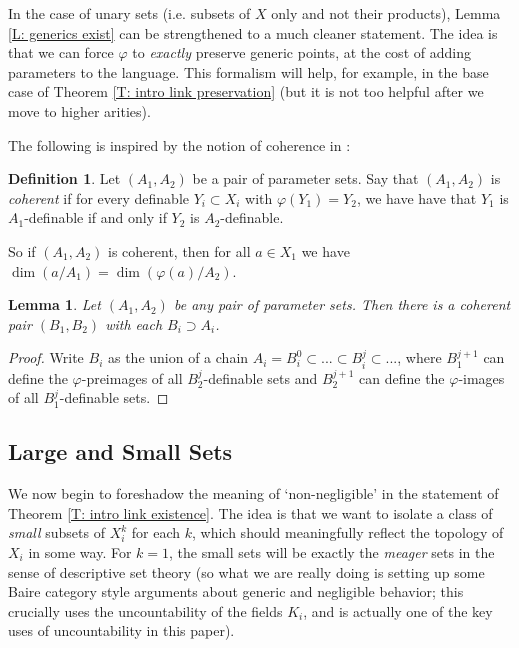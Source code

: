 \documentclass{amsart}
\newtheorem{lemma}[theorem]{Lemma}
\theoremstyle{definition}
\newtheorem{definition}[theorem]{Definition}
\begin{document}
In the case of unary sets (i.e. subsets of $X$ only and not their products), Lemma \ref{L: generics exist} can be strengthened to a much cleaner statement. The idea is that we can force $\varphi$ to \textit{exactly} preserve generic points, at the cost of adding parameters to the language. This formalism will help, for example, in the base case of Theorem \ref{T: intro link preservation} (but it is not too helpful after we move to higher arities).

The following is inspired by the notion of coherence in \cite{CasACF0}: 

\begin{definition}
    Let $(A_1,A_2)$ be a pair of parameter sets. Say that $(A_1,A_2)$ is \textit{coherent} if for every definable $Y_i\subset X_i$ with $\varphi(Y_1)=Y_2$, we have have that $Y_1$ is $A_1$-definable if and only if $Y_2$ is $A_2$-definable.
\end{definition}

So if $(A_1,A_2)$ is coherent, then for all $a\in X_1$ we have $\dim(a/A_1)=\dim(\varphi(a)/A_2)$.

\begin{lemma}\label{L: existence of coherent sets}
    Let $(A_1,A_2)$ be any pair of parameter sets. Then there is a coherent pair $(B_1,B_2)$ with each $B_i\supset A_i$.
\end{lemma}
\begin{proof}
    Write $B_i$ as the union of a chain $A_i=B_i^0\subset...\subset B_i^j\subset...$, where $B_1^{j+1}$ can define the $\varphi$-preimages of all $B_2^j$-definable sets and $B_2^{j+1}$ can define the $\varphi$-images of all $B_1^j$-definable sets. 
\end{proof}


\subsection{Large and Small Sets}

We now begin to foreshadow the meaning of `non-negligible' in the statement of Theorem \ref{T: intro link existence}. The idea is that we want to isolate a class of \textit{small} subsets of $X_i^k$ for each $k$, which should meaningfully reflect the topology of $X_i$ in some way. For $k=1$, the small sets will be exactly the \textit{meager} sets in the sense of descriptive set theory (so what we are really doing is setting up some Baire category style arguments about generic and negligible behavior; this crucially uses the uncountability of the fields $K_i$, and is actually one of the key uses of uncountability in this paper).
\end{document}
